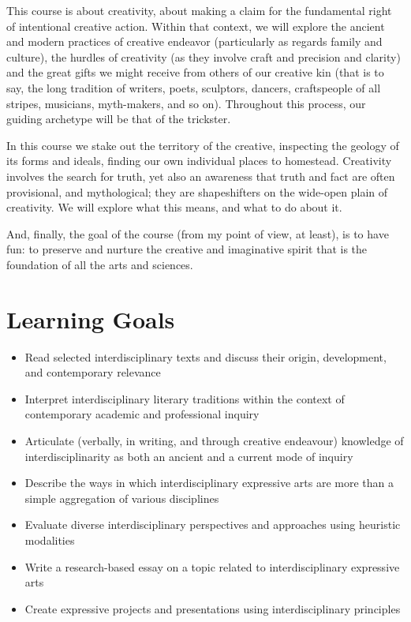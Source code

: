 \documentclass[letterpaper,10pt,headsepline]{scrreprt}
\begin{document}
This course is about creativity, about making a claim for the fundamental right of intentional creative action. Within that context, we will explore the ancient and modern practices of creative endeavor (particularly as regards family and culture), the hurdles of creativity (as they involve craft and precision and clarity) and the great gifts we might receive from others of our creative kin (that is to say, the long tradition of writers, poets, sculptors, dancers, craftspeople of all stripes, musicians, myth-makers, and so on). Throughout this process, our guiding archetype will be that of the trickster.

In this course we stake out the territory of the creative, inspecting the geology of its forms and ideals, finding our own individual places to homestead. Creativity involves the search for truth, yet also an awareness that truth and fact are often provisional, and mythological; they are shapeshifters on the wide-open plain of creativity. We will explore what this means, and what to do about it.

And, finally, the goal of the course (from my point of view, at least), is to have fun: to preserve and nurture the creative and imaginative spirit that is the foundation of all the arts and sciences.

\section{Learning Goals}
\begin{itemize}

\item Read selected interdisciplinary texts and discuss their origin, development, and contemporary relevance
\item Interpret interdisciplinary literary traditions within the context of contemporary academic and professional inquiry
\item Articulate (verbally, in writing, and through creative endeavour) knowledge of interdisciplinarity as both an ancient and a current mode of inquiry
\item Describe the ways in which interdisciplinary expressive arts are more than a simple aggregation of various disciplines
\item Evaluate diverse interdisciplinary perspectives and approaches using heuristic modalities
\item Write a research-based essay on a topic related to interdisciplinary expressive arts
\item Create expressive projects and presentations using interdisciplinary principles

\end{itemize}
\clearpage
\end{document}
